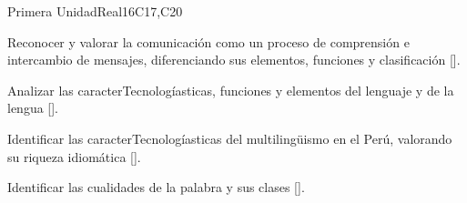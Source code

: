 \begin{syllabus}
\begin{unit}{Primera Unidad}{}{Real}{16}{C17,C20}
\begin{learningoutcomes}
   \item Reconocer y valorar la comunicación como un proceso de comprensión e intercambio de mensajes, diferenciando sus elementos, funciones y clasificación [\Usage].
   \item Analizar las caracterTecnologíasticas, funciones y elementos del lenguaje y de la lengua [\Usage].
   \item Identificar las caracterTecnologíasticas del multilingüismo en el Perú, valorando su riqueza idiomática [\Usage].
   \item Identificar las cualidades de la palabra y sus clases [\Usage].
\end{learningoutcomes}
\end{unit}

\begin{coursebibliography}
\end{coursebibliography}

\end{syllabus}

